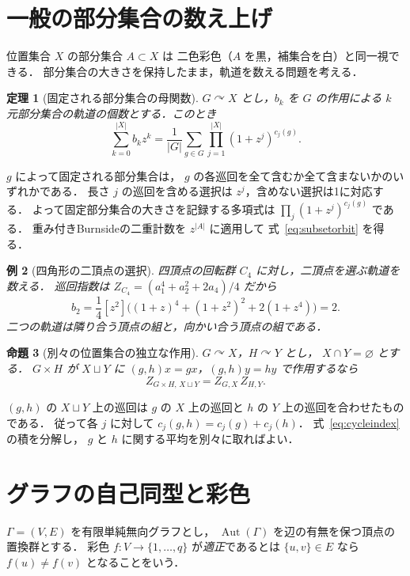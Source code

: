 \documentclass[a5paper,10pt,onecolumn]{jsarticle}
\makeatletter
\theoremstyle{mathnotetheorem}
\newtheorem{theorem}{定理}[section]
\newtheorem{proposition}[theorem]{命題}
\newtheorem{example}[theorem]{例}
\renewcommand{\proofname}{証明}
\renewenvironment{proof}[1][\proofname]{%
  \par\pushQED{\qed}\normalfont\topsep4\p@\@plus2\p@\relax
  \trivlist\item[\hskip\labelsep\bfseries #1]\ignorespaces
}{\popQED\endtrivlist\@endpefalse}
\makeatother
\begin{document}
\section{一般の部分集合の数え上げ}
位置集合 $X$ の部分集合 $A\subset X$ は
二色彩色（$A$ を黒，補集合を白）と同一視できる．
部分集合の大きさを保持したまま，軌道を数える問題を考える．

\begin{theorem}[固定される部分集合の母関数]\label{thm:subsetorbit}
$G\curvearrowright X$ とし，$b_k$ を $G$ の作用による
$k$ 元部分集合の軌道の個数とする．このとき
\begin{equation}\label{eq:subsetorbit}
 \sum_{k=0}^{|X|}b_kz^k
 =\frac1{|G|}\sum_{g\in G}
 \prod_{j=1}^{|X|}(1+z^j)^{c_j(g)}.
\end{equation}
\end{theorem}
\begin{proof}
$g$ によって固定される部分集合は，
$g$ の各巡回を全て含むか全て含まないかのいずれかである．
長さ $j$ の巡回を含める選択は $z^j$，含めない選択は1に対応する．
よって固定部分集合の大きさを記録する多項式は
$\prod_j(1+z^j)^{c_j(g)}$ である．
重み付きBurnsideの二重計数を $z^{|A|}$ に適用して
式~\eqref{eq:subsetorbit} を得る．
\end{proof}

\begin{example}[四角形の二頂点の選択]
四頂点の回転群 $C_4$ に対し，二頂点を選ぶ軌道を数える．
巡回指数は
$Z_{C_4}=(a_1^4+a_2^2+2a_4)/4$ だから
\[
 b_2=\frac14[z^2]\bigl((1+z)^4+(1+z^2)^2
 +2(1+z^4)\bigr)=2.
\]
二つの軌道は隣り合う頂点の組と，向かい合う頂点の組である．
\end{example}

\begin{proposition}[別々の位置集合の独立な作用]
$G\curvearrowright X$，$H\curvearrowright Y$ とし，
$X\cap Y=\varnothing$ とする．
$G\times H$ が $X\sqcup Y$ に
$(g,h)x=gx$，$(g,h)y=hy$ で作用するなら
\[
 Z_{G\times H,\,X\sqcup Y}=Z_{G,X}\,Z_{H,Y}.
\]
\end{proposition}
\begin{proof}
$(g,h)$ の $X\sqcup Y$ 上の巡回は
$g$ の $X$ 上の巡回と $h$ の $Y$ 上の巡回を合わせたものである．
従って各 $j$ に対して
$c_j(g,h)=c_j(g)+c_j(h)$．
式~\eqref{eq:cycleindex} の積を分解し，
$g$ と $h$ に関する平均を別々に取ればよい．
\end{proof}

\section{グラフの自己同型と彩色}
$\Gamma=(V,E)$ を有限単純無向グラフとし，
$\operatorname{Aut}(\Gamma)$ を辺の有無を保つ頂点の置換群とする．
彩色 $f:V\to\{1,\ldots,q\}$ が\emph{適正}であるとは
$\{u,v\}\in E$ なら $f(u)\ne f(v)$ となることをいう．
\end{document}
